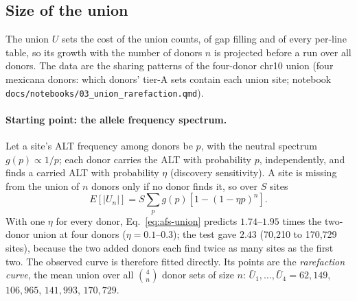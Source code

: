\documentclass[11pt]{article}
\newcommand{\code}[1]{\texttt{#1}}
\begin{document}
\subsection{Size of the union}
\label{sec:unionsize}
The union $U$ sets the cost of the union counts, of gap filling and of every per-line table, so its growth with the number of donors
$n$ is projected before a run over all donors. The data are the sharing patterns of the four-donor chr10 union (four mexicana donors:
which donors' tier-A sets contain each union site; notebook \code{docs/notebooks/03\_union\_rarefaction.qmd}).

\paragraph{Starting point: the allele frequency spectrum.} Let a site's ALT frequency among donors be $p$, with the neutral spectrum
$g(p)\propto1/p$; each donor carries the ALT with probability $p$, independently, and finds a carried ALT with probability $\eta$
(discovery sensitivity). A site is missing from the union of $n$ donors only if no donor finds it, so over $S$ sites
\begin{equation}
E[|U_n|]=S\sum_p g(p)\left[1-(1-\eta p)^n\right].
\label{eq:afs-union}
\end{equation}
With one $\eta$ for every donor, Eq.~\eqref{eq:afs-union} predicts $1.74$--$1.95$ times the two-donor union at four donors
($\eta=0.1$--$0.3$); the test gave $2.43$ (70{,}210 to 170{,}729 sites), because the two added donors each find twice as many sites
as the first two. The observed curve is therefore fitted directly. Its points are the \emph{rarefaction curve}, the mean union over
all $\binom4n$ donor sets of size $n$: $\bar U_1,\dots,\bar U_4=62{,}149$, $106{,}965$, $141{,}993$, $170{,}729$.
\end{document}
